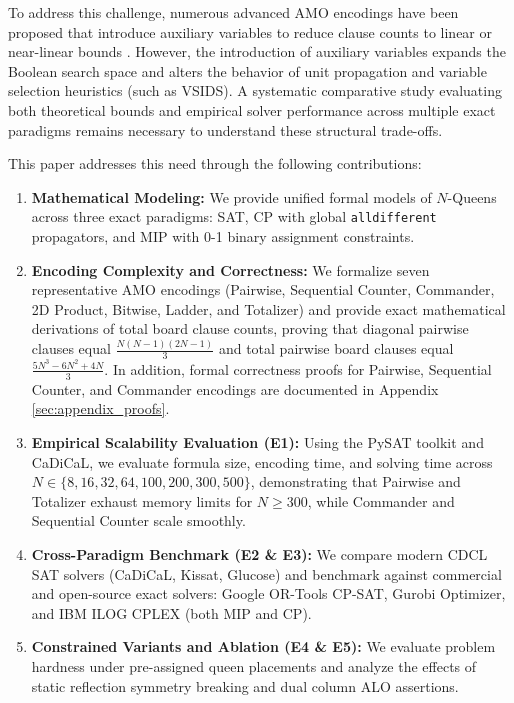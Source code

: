 \documentclass[a4paper,fleqn]{cas-sc}
\begin{document}
To address this challenge, numerous advanced AMO encodings have been proposed that introduce auxiliary variables to reduce clause counts to linear or near-linear bounds \citep{sinz2005towards, klieber2007commander, chen2010product, frisch2005symmetry, bailleux2003totalizer, gent2004ladder}. However, the introduction of auxiliary variables expands the Boolean search space and alters the behavior of unit propagation and variable selection heuristics (such as VSIDS). A systematic comparative study evaluating both theoretical bounds and empirical solver performance across multiple exact paradigms remains necessary to understand these structural trade-offs.

This paper addresses this need through the following contributions:
\begin{enumerate}
    \item \textbf{Mathematical Modeling:} We provide unified formal models of $N$-Queens across three exact paradigms: SAT, CP with global \texttt{alldifferent} propagators, and MIP with 0-1 binary assignment constraints.
    \item \textbf{Encoding Complexity and Correctness:} We formalize seven representative AMO encodings (Pairwise, Sequential Counter, Commander, 2D Product, Bitwise, Ladder, and Totalizer) and provide exact mathematical derivations of total board clause counts, proving that diagonal pairwise clauses equal $\frac{N(N-1)(2N-1)}{3}$ and total pairwise board clauses equal $\frac{5N^3 - 6N^2 + 4N}{3}$. In addition, formal correctness proofs for Pairwise, Sequential Counter, and Commander encodings are documented in Appendix \ref{sec:appendix_proofs}.
    \item \textbf{Empirical Scalability Evaluation (E1):} Using the PySAT toolkit \citep{ignatiev2018pysat, ignatiev2024towards} and CaDiCaL, we evaluate formula size, encoding time, and solving time across $N \in \{8, 16, 32, 64, 100, 200, 300, 500\}$, demonstrating that Pairwise and Totalizer exhaust memory limits for $N \ge 300$, while Commander and Sequential Counter scale smoothly.
    \item \textbf{Cross-Paradigm Benchmark (E2 \& E3):} We compare modern CDCL SAT solvers (CaDiCaL, Kissat, Glucose) and benchmark against commercial and open-source exact solvers: Google OR-Tools CP-SAT, Gurobi Optimizer, and IBM ILOG CPLEX (both MIP and CP).
    \item \textbf{Constrained Variants and Ablation (E4 \& E5):} We evaluate problem hardness under pre-assigned queen placements and analyze the effects of static reflection symmetry breaking and dual column ALO assertions.
\end{enumerate}
\end{document}
